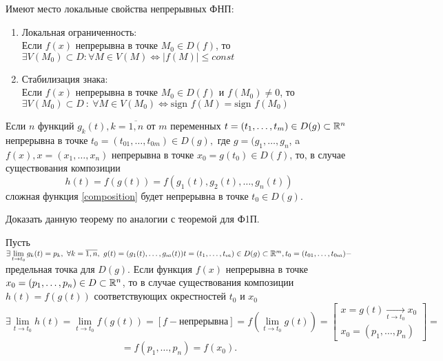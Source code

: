 \documentclass[../../main.tex]{subfiles}
\begin{document}
    Имеют место локальные свойства непрерывных ФНП:
    \begin{enumerate}
    	\item Локальная ограниченность: \\
    	Если $f(x)$ непрерывна в точке $M_0 \in D(f)$, то $\exists V(M_0)
    	\subset D : \forall M \in V(M) \iff |f(M)| \leq const$
    	\item Стабилизация знака: \\
    	Если $f(x)$ непрерывна в точке $M_0 \in D(f)$ и $f(M_0) \ne 0$, то 
       $\exists V(M_0) \subset D \ : \ \forall M \in V(M_0) \iff \text{sign }
       f(M)	= \text{sign }f(M_0)$
    \end{enumerate}
    \begin{thm}
    	Если $n$ функций $g_k(t), k = 
    	\overline{1,n}$ от $m$ переменных $t = (t_1, \ldots, t_m) \in D(g) 
    	\subset \mathbb{R}^n$ непрерывна в точке $t_0 = \left( t_{01}, \ldots, t_{0m} 
    	\right) \in D(g),$ где $g = (g_1, \ldots, g_n$, a $f(x), 
    	x = (x_1, \ldots, x_n)$ непрерывна в точке $x_0 = g(t_0) \in D(f)$,
    	то, в случае существования композиции 
    	\begin{equation}
    	\label{composition}
    		h(t) = f(g(t)) = f(g_1(t), g_2(t), \ldots, g_n(t))
    	\end{equation}
        сложная функция \eqref{composition} будет непрерывна в точке 
        $t_0 \in D(g)$.
    \end{thm}
    \begin{exc}
    	Доказать данную теорему по аналогии с теоремой для Ф1П.
    \end{exc}
    \begin{crl*}
    	Пусть $\exists \lim\limits_{t \to t_0}g_k(t) = p_k, \ 
    	\forall k = \overline{1, n}, \  g(t) = (g_1(t), \ldots, g_m(t)) t = (t_1,
    	 \ldots, t_m) \in D(g) \subset \R^m, t_0 = (t_{01}, \ldots, t_{0m}) - $
    	предельная точка для $D(g)$. Если функция $f(x)$ непрерывна в точке 
    	$x_0 = (p_1, \ldots, p_n) \in D \subset \mathbb{R}^n$, то в случае 
    	существования композиции $h(t) = f(g(t))$ соответствующих окрестностей
    	$t_0$ и $x_0$ 
    	\[
    	    \exists \lim\limits_{t \to t_0}h(t) = \lim\limits_{t \to t_0}f(g(t)) =
    		\left[f - \text{непрерывна}\right] = f(\lim\limits_{t \to t_0}g(t)) = 
    		\left[
    		\begin{array}{l}
    			x = g(t) \underset{t \to t_0}{\to} x_0 \\
    			x_0 = (p_1, \ldots, p_n) 
    		\end{array}
    		\right] = 
    	\]
    	\[
    		= f(p_1, \ldots, p_n) = f(x_0).
    	\]
    \end{crl*}
\end{document}
